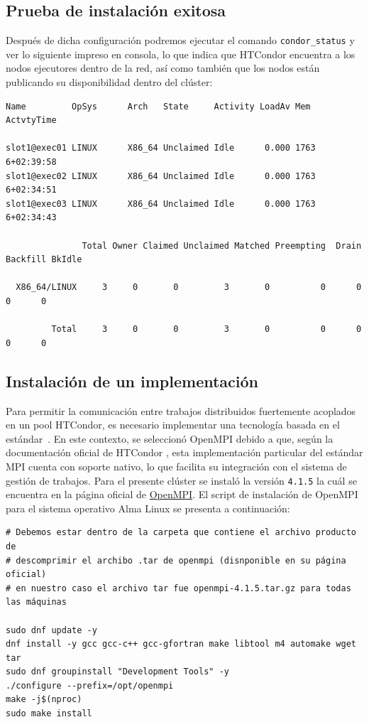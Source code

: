 \FloatBarrier\subsection{Prueba de instalación exitosa}

Después de dicha configuración podremos ejecutar el comando \texttt{condor\_status} y ver lo siguiente impreso en consola, lo que indica que HTCondor encuentra a los nodos ejecutores dentro de la red, así como también que los nodos están publicando su disponibilidad dentro del clúster:

\begin{verbatim}
Name         OpSys      Arch   State     Activity LoadAv Mem   ActvtyTime

slot1@exec01 LINUX      X86_64 Unclaimed Idle      0.000 1763  6+02:39:58
slot1@exec02 LINUX      X86_64 Unclaimed Idle      0.000 1763  6+02:34:51
slot1@exec03 LINUX      X86_64 Unclaimed Idle      0.000 1763  6+02:34:43

               Total Owner Claimed Unclaimed Matched Preempting  Drain Backfill BkIdle

  X86_64/LINUX     3     0       0         3       0          0      0        0      0

         Total     3     0       0         3       0          0      0        0      0
\end{verbatim}


\FloatBarrier\subsection{Instalación de un implementación \MPI}

Para permitir la comunicación entre trabajos distribuidos fuertemente acoplados en un pool HTCondor, es necesario implementar una tecnología basada en el estándar~\MPI. En este contexto, se seleccionó OpenMPI debido a que, según la documentación oficial de HTCondor \cite{HTCondor_Parallel}, esta implementación particular del estándar MPI cuenta con soporte nativo, lo que facilita su integración con el sistema de gestión de trabajos. Para el presente clúster se instaló la versión \texttt{4.1.5} la cuál se encuentra en la página oficial de \href{https://www.open-mpi.org/software/ompi/v4.1/}{OpenMPI}. El script de instalación de OpenMPI para el sistema operativo Alma Linux se presenta a continuación:

\begin{verbatim}
# Debemos estar dentro de la carpeta que contiene el archivo producto de 
# descomprimir el archibo .tar de openmpi (disnponible en su página oficial)
# en nuestro caso el archivo tar fue openmpi-4.1.5.tar.gz para todas las máquinas

sudo dnf update -y
dnf install -y gcc gcc-c++ gcc-gfortran make libtool m4 automake wget tar
sudo dnf groupinstall "Development Tools" -y
./configure --prefix=/opt/openmpi
make -j$(nproc)
sudo make install
\end{verbatim}



